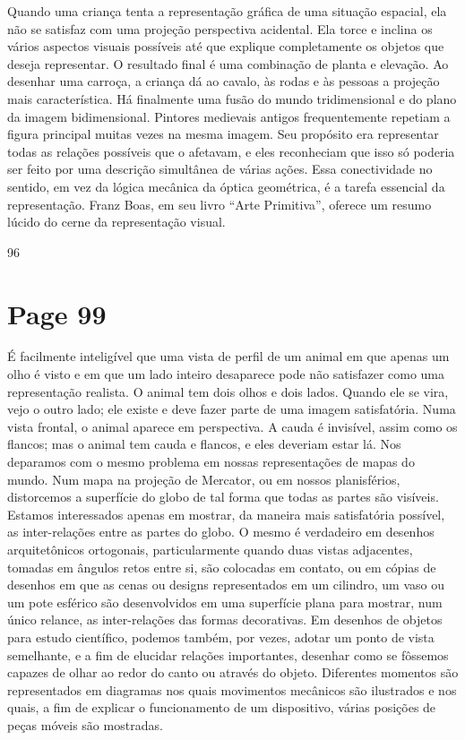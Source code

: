 \documentclass[a4paper]{article}
\begin{document}
Quando uma criança tenta a representação gráfica de uma situação espacial, ela não se satisfaz com uma projeção perspectiva acidental. Ela torce e inclina os vários aspectos visuais possíveis até que explique completamente os objetos que deseja representar. O resultado final é uma combinação de planta e elevação. Ao desenhar uma carroça, a criança dá ao cavalo, às rodas e às pessoas a projeção mais característica. Há finalmente uma fusão do mundo tridimensional e do plano da imagem bidimensional. Pintores medievais antigos frequentemente repetiam a figura principal muitas vezes na mesma imagem. Seu propósito era representar todas as relações possíveis que o afetavam, e eles reconheciam que isso só poderia ser feito por uma descrição simultânea de várias ações. Essa conectividade no sentido, em vez da lógica mecânica da óptica geométrica, é a tarefa essencial da representação. Franz Boas, em seu livro ``Arte Primitiva'', oferece um resumo lúcido do cerne da representação visual.

\vfill
\raggedright 96

\newpage
\section*{Page 99}

É facilmente inteligível que uma vista de perfil de um animal em que apenas um olho é visto e em que um lado inteiro desaparece pode não satisfazer como uma representação realista. O animal tem dois olhos e dois lados. Quando ele se vira, vejo o outro lado; ele existe e deve fazer parte de uma imagem satisfatória. Numa vista frontal, o animal aparece em perspectiva. A cauda é invisível, assim como os flancos; mas o animal tem cauda e flancos, e eles deveriam estar lá. Nos deparamos com o mesmo problema em nossas representações de mapas do mundo. Num mapa na projeção de Mercator, ou em nossos planisférios, distorcemos a superfície do globo de tal forma que todas as partes são visíveis. Estamos interessados apenas em mostrar, da maneira mais satisfatória possível, as inter-relações entre as partes do globo. O mesmo é verdadeiro em desenhos arquitetônicos ortogonais, particularmente quando duas vistas adjacentes, tomadas em ângulos retos entre si, são colocadas em contato, ou em cópias de desenhos em que as cenas ou designs representados em um cilindro, um vaso ou um pote esférico são desenvolvidos em uma superfície plana para mostrar, num único relance, as inter-relações das formas decorativas. Em desenhos de objetos para estudo científico, podemos também, por vezes, adotar um ponto de vista semelhante, e a fim de elucidar relações importantes, desenhar como se fôssemos capazes de olhar ao redor do canto ou através do objeto. Diferentes momentos são representados em diagramas nos quais movimentos mecânicos são ilustrados e nos quais, a fim de explicar o funcionamento de um dispositivo, várias posições de peças móveis são mostradas.
\end{document}
